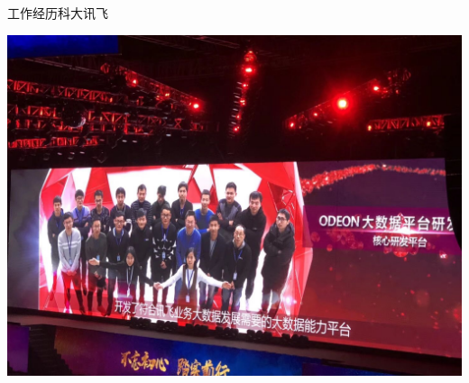 \documentclass[xcolor=svgnames, t, aspectratio=169]{ctexbeamer}
\begin{document}
\begin{frame}{工作经历}{科大讯飞}
  \begin{center}
    \includegraphics[scale=0.2,trim=0 0 0 300,clip]{iflytek.jpg}
  \end{center}
\end{frame}
\end{document}
